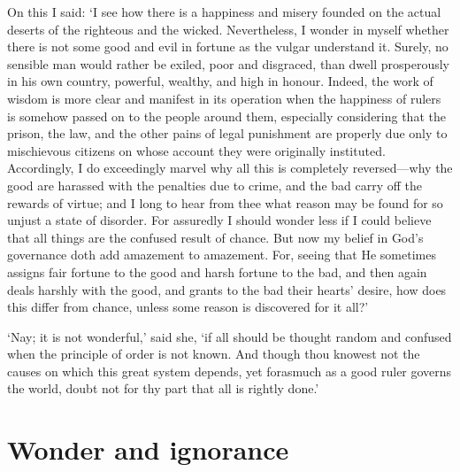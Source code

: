 \documentclass[12pt]{book}
\begin{document}
On this I said: `I see how there is a happiness and misery founded on
the actual deserts of the righteous and the wicked. Nevertheless, I
wonder in myself whether there is not some good and evil in fortune as
the vulgar understand it. Surely, no sensible man would rather be
exiled, poor and disgraced, than dwell prosperously in his own country,
powerful, wealthy, and high in honour. Indeed, the work of wisdom is
more clear and manifest in its operation when the happiness of rulers is
somehow passed on to the people around them, especially considering that
the prison, the law, and the other pains of legal punishment are
properly due only to mischievous citizens on whose account they were
originally instituted. Accordingly, I do exceedingly marvel why all this
is completely reversed---why the good are harassed with the penalties due
to crime, and the bad carry off the rewards of virtue; and I long to
hear from thee what reason may be found for so unjust a state of
disorder. For assuredly I should wonder less if I could believe that all
things are the confused result of chance. But now my belief in God's
governance doth add amazement to amazement. For, seeing that He
sometimes assigns fair fortune to the good and harsh fortune to the bad,
and then again deals harshly with the good, and grants to the bad their
hearts' desire, how does this differ from chance, unless some reason is
discovered for it all?'

`Nay; it is not wonderful,' said she, `if all should be thought random
and confused when the principle of order is not known. And though thou
knowest not the causes on which this great system depends, yet forasmuch
as a good ruler governs the world, doubt not for thy part that all is
rightly done.'



\section{Wonder and ignorance}
\end{document}
